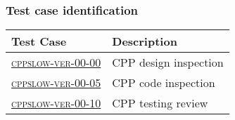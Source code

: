 \subsubsection{Test case identification}

\begin{longtable} {|p{}|p{}|}\hline
\textbf{Test Case}  & \textbf{Description} \\\hline
\hyperref[cppslow-ver-00-00]{\textsc{cppslow-ver-00-00}} & CPP design inspection \\\hline
\hyperref[cppslow-ver-00-05]{\textsc{cppslow-ver-00-05}} & CPP code inspection \\\hline
\hyperref[cppslow-ver-00-10]{\textsc{cppslow-ver-00-10}} & CPP testing review \\\hline
\end{longtable}
